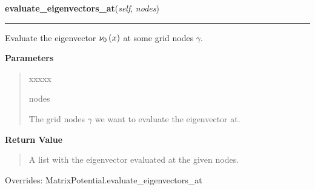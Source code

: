     \vspace{0.5ex}

\hspace{.8\funcindent}\begin{boxedminipage}{\funcwidth}

    \raggedright \textbf{evaluate\_eigenvectors\_at}(\textit{self}, \textit{nodes})

    \vspace{-1.5ex}

    \rule{\textwidth}{0.5\fboxrule}
\setlength{\parskip}{2ex}
    Evaluate the eigenvector $\nu_0\left( x \right)$ at some grid
    nodes $\gamma$.

\setlength{\parskip}{1ex}
      \textbf{Parameters}
      \vspace{-1ex}

      \begin{quote}
        \begin{Ventry}{xxxxx}

          \item[nodes]

          The grid nodes $\gamma$ we want to evaluate the
          eigenvector at.

        \end{Ventry}

      \end{quote}

      \textbf{Return Value}
    \vspace{-1ex}

      \begin{quote}
      A list with the eigenvector evaluated at the given nodes.

      \end{quote}

      Overrides: MatrixPotential.evaluate\_eigenvectors\_at

    \end{boxedminipage}

    \vspace{0.5ex}

